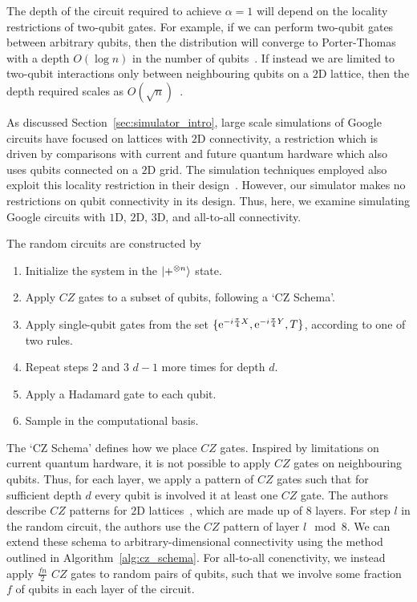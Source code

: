 The depth of the circuit required to achieve $\alpha=1$ will depend on the locality restrictions of two-qubit gates. For example, if we can perform two-qubit gates between arbitrary qubits, then the distribution will converge to Porter-Thomas with a depth $O(\log{n})$ in the number of qubits~\cite{Emerson2098,Boixo2016}. If instead we are limited to two-qubit interactions only between neighbouring qubits on a $2$D lattice, then the depth required scales as $O(\sqrt{n})$~\cite{Harrow2018}.\par
As discussed Section~\ref{sec:simulator_intro}, large scale simulations of Google circuits have focused on lattices with $2$D connectivity, a restriction which is driven by comparisons with current and future quantum hardware which also uses qubits connected on a $2$D grid. The simulation techniques employed also exploit this locality restriction in their design~\cite{Pendault2017,Chen2018b,Markov2018,Villalonga2019}. However, our simulator makes no restrictions on qubit connectivity in its design. Thus, here, we examine simulating Google circuits with $1$D, $2$D, $3$D, and all-to-all connectivity.\par
The random circuits are constructed by
\begin{enumerate}
    \item Initialize the system in the $\ket{+^{\otimes n}}$ state.
    \item Apply $CZ$ gates to a subset of qubits, following a `CZ Schema'.
    \item Apply single-qubit gates from the set $\{\mathrm{e}^{-i\frac{\pi}{4}X},\mathrm{e}^{-i\frac{\pi}{4}Y},T\}$, according to one of two rules.
    \item Repeat steps $2$ and $3$ $d-1$ more times for depth $d$.
    \item Apply a Hadamard gate to each qubit.
    \item Sample in the computational basis.
\end{enumerate}
The `CZ Schema' defines how we place $CZ$ gates. Inspired by limitations on current quantum hardware, it is not possible to apply $CZ$ gates on neighbouring qubits. Thus, for each layer, we apply a pattern of $CZ$ gates such that for sufficient depth $d$ every qubit is involved it at least one $CZ$ gate. The authors describe $CZ$ patterns for $2$D lattices~\cite{Boixo2016,Villalonga2018}, which are made up of $8$ layers. For step $l$ in the random circuit, the authors use the $CZ$ pattern of layer $l\mod{8}$. We can extend these schema to arbitrary-dimensional connectivity using the method outlined in Algorithm~\ref{alg:cz_schema}. For all-to-all conenctivity, we instead apply $\frac{fn}{2}$ $CZ$ gates to random pairs of qubits, such that we involve some fraction $f$ of qubits in each layer of the circuit.\par
